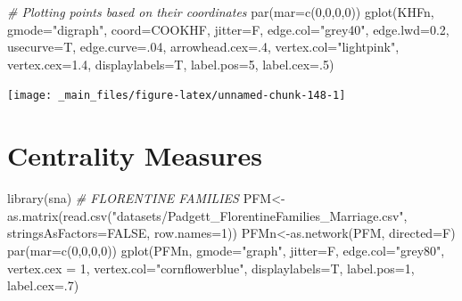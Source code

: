 \documentclass[
  notitlepage,
  onecolumn,
  openany]{book}
\newenvironment{Shaded}{\begin{snugshade}}{\end{snugshade}}
\newcommand{\AttributeTok}[1]{\textcolor[rgb]{0.77,0.63,0.00}{#1}}
\newcommand{\CommentTok}[1]{\textcolor[rgb]{0.56,0.35,0.01}{\textit{#1}}}
\newcommand{\ConstantTok}[1]{\textcolor[rgb]{0.00,0.00,0.00}{#1}}
\newcommand{\DecValTok}[1]{\textcolor[rgb]{0.00,0.00,0.81}{#1}}
\newcommand{\FloatTok}[1]{\textcolor[rgb]{0.00,0.00,0.81}{#1}}
\newcommand{\FunctionTok}[1]{\textcolor[rgb]{0.00,0.00,0.00}{#1}}
\newcommand{\NormalTok}[1]{#1}
\newcommand{\OtherTok}[1]{\textcolor[rgb]{0.56,0.35,0.01}{#1}}
\newcommand{\StringTok}[1]{\textcolor[rgb]{0.31,0.60,0.02}{#1}}
\begin{document}
\begin{Shaded}
\begin{Highlighting}[]
\CommentTok{\# Plotting points based on their coordinates}
\FunctionTok{par}\NormalTok{(}\AttributeTok{mar=}\FunctionTok{c}\NormalTok{(}\DecValTok{0}\NormalTok{,}\DecValTok{0}\NormalTok{,}\DecValTok{0}\NormalTok{,}\DecValTok{0}\NormalTok{))}
\FunctionTok{gplot}\NormalTok{(KHFn,}
      \AttributeTok{gmode=}\StringTok{"digraph"}\NormalTok{,  }
      \AttributeTok{coord=}\NormalTok{COOKHF,}
      \AttributeTok{jitter=}\NormalTok{F, }
      \AttributeTok{edge.col=}\StringTok{"grey40"}\NormalTok{,}
      \AttributeTok{edge.lwd=}\FloatTok{0.2}\NormalTok{,}
      \AttributeTok{usecurve=}\NormalTok{T,}
      \AttributeTok{edge.curve=}\NormalTok{.}\DecValTok{04}\NormalTok{, }
      \AttributeTok{arrowhead.cex=}\NormalTok{.}\DecValTok{4}\NormalTok{,}
      \AttributeTok{vertex.col=}\StringTok{"lightpink"}\NormalTok{,   }
      \AttributeTok{vertex.cex=}\FloatTok{1.4}\NormalTok{,}
      \AttributeTok{displaylabels=}\NormalTok{T,    }
      \AttributeTok{label.pos=}\DecValTok{5}\NormalTok{,        }
      \AttributeTok{label.cex=}\NormalTok{.}\DecValTok{5}\NormalTok{)       }
\end{Highlighting}
\end{Shaded}

\begin{center}\texttt{[image: \_main\_files/figure-latex/unnamed-chunk-148-1]} \end{center}

\hypertarget{centrality-measures}{%
\chapter{Centrality Measures}\label{centrality-measures}}

\begin{Shaded}
\begin{Highlighting}[]
\FunctionTok{library}\NormalTok{(sna)}
\CommentTok{\# FLORENTINE FAMILIES}
\NormalTok{PFM}\OtherTok{\textless{}{-}}\FunctionTok{as.matrix}\NormalTok{(}\FunctionTok{read.csv}\NormalTok{(}\StringTok{"datasets/Padgett\_FlorentineFamilies\_Marriage.csv"}\NormalTok{,}
                        \AttributeTok{stringsAsFactors=}\ConstantTok{FALSE}\NormalTok{, }\AttributeTok{row.names=}\DecValTok{1}\NormalTok{))}
\NormalTok{PFMn}\OtherTok{\textless{}{-}}\FunctionTok{as.network}\NormalTok{(PFM, }\AttributeTok{directed=}\NormalTok{F)}
\FunctionTok{par}\NormalTok{(}\AttributeTok{mar=}\FunctionTok{c}\NormalTok{(}\DecValTok{0}\NormalTok{,}\DecValTok{0}\NormalTok{,}\DecValTok{0}\NormalTok{,}\DecValTok{0}\NormalTok{))}
\FunctionTok{gplot}\NormalTok{(PFMn, }
      \AttributeTok{gmode=}\StringTok{"graph"}\NormalTok{,}
      \AttributeTok{jitter=}\NormalTok{F,}
      \AttributeTok{edge.col=}\StringTok{"grey80"}\NormalTok{,}
      \AttributeTok{vertex.cex =} \DecValTok{1}\NormalTok{,}
      \AttributeTok{vertex.col=}\StringTok{"cornflowerblue"}\NormalTok{,}
      \AttributeTok{displaylabels=}\NormalTok{T,}
      \AttributeTok{label.pos=}\DecValTok{1}\NormalTok{,}
      \AttributeTok{label.cex=}\NormalTok{.}\DecValTok{7}\NormalTok{)}
\end{Highlighting}
\end{Shaded}
\end{document}
